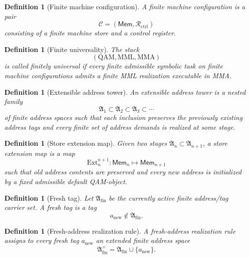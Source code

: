 \documentclass[12pt,a4paper]{article}
\newtheorem{definition}[theorem]{Definition}
\begin{document}
\begin{definition}[Finite machine configuration]\label{def:finite-machine-configuration-computational-layer}
A \emph{finite machine configuration} is a pair
\[
\mathcal{C}=(\mathsf{Mem},\mathcal{R}_{\mathrm{ctrl}})
\]
consisting of a finite machine store and a control register.
\end{definition}

\begin{definition}[Finite universality]\label{def:finite-universality-computational-layer}
The stack
\[
(\mathrm{QAM},\mathrm{MML},\mathrm{MMA})
\]
is called \emph{finitely universal} if every finite admissible symbolic task on finite machine configurations admits a finite MML realization executable in MMA.
\end{definition}

\begin{definition}[Extensible address tower]\label{def:extensible-address-tower-computational-layer}
An \emph{extensible address tower} is a nested family
\[
\mathfrak{A}_1\subset\mathfrak{A}_2\subset\mathfrak{A}_3\subset\cdots
\]
of finite address spaces such that each inclusion preserves the previously existing address tags and every finite set of address demands is realized at some stage.
\end{definition}

\begin{definition}[Store extension map]\label{def:store-extension-map-computational-layer}
Given two stages \(\mathfrak{A}_n\subset\mathfrak{A}_{n+1}\), a \emph{store extension map} is a map
\[
\mathrm{Ext}_{n}^{n+1}:\mathsf{Mem}_n\longmapsto \mathsf{Mem}_{n+1}
\]
such that old address contents are preserved and every new address is initialized by a fixed admissible default QAM-object.
\end{definition}

\begin{definition}[Fresh tag]\label{def:fresh-tag-computational-layer}
Let \(\mathfrak{A}_{\mathrm{fin}}\) be the currently active finite address/tag carrier set. A \emph{fresh tag} is a tag
\[
a_{\mathrm{new}}\notin\mathfrak{A}_{\mathrm{fin}}.
\]
\end{definition}

\begin{definition}[Fresh-address realization rule]\label{def:fresh-address-realization-rule-computational-layer}
A \emph{fresh-address realization rule} assigns to every fresh tag \(a_{\mathrm{new}}\) an extended finite address space
\[
\mathfrak{A}_{\mathrm{fin}}^{+}=\mathfrak{A}_{\mathrm{fin}}\cup\{a_{\mathrm{new}}\}.
\]
\end{definition}
\end{document}
